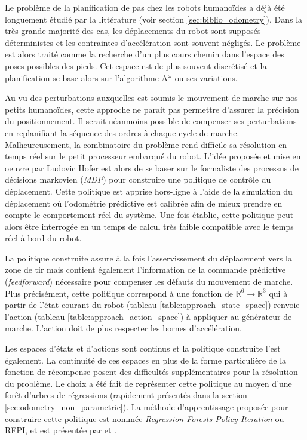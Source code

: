 Le problème de la planification de pas chez les robots humanoïdes 
a déjà été longuement étudié par la littérature (voir section \ref{sec:biblio_odometry}).
Dans la très grande majorité des cas, les déplacements du robot sont supposés
déterministes et les contraintes d'accélération sont souvent négligés. 
Le problème est alors traité comme la recherche d'un plus
cours chemin dans l'espace des poses possibles des pieds.
Cet espace est de plus souvent discrétisé et la planification se base
alors sur l'algorithme A* ou ses variations.

Au vu des perturbations auxquelles est soumis le mouvement de 
marche sur nos petits humanoïdes, cette approche ne parait pas 
permettre d'assurer la précision du positionnement.
Il serait néanmoins possible de compenser ses perturbations en replanifiant
la séquence des ordres à chaque cycle de marche.
Malheureusement, la combinatoire du problème rend difficile
sa résolution en temps réel sur le petit processeur embarqué du robot.
L'idée proposée et mise en oeuvre par Ludovic Hofer est alors 
de se baser sur le formaliste des processus de décisions markovien (\textit{MDP})
pour construire une politique de contrôle du déplacement.
Cette politique est apprise hors-ligne à l'aide de la simulation
du déplacement où l'odométrie prédictive est calibrée
afin de mieux prendre en compte le comportement réel du système.
Une fois établie, cette politique peut alors être interrogée
en un temps de calcul très faible compatible avec le temps réel 
à bord du robot.

La politique construite assure à la fois l'asservissement du déplacement
vers la zone de tir mais contient également l'information de la
commande prédictive (\textit{feedforward}) nécessaire pour compenser
les défauts du mouvement de marche.
Plus précisément, cette politique correspond à une fonction
de $\mathbb{R}^{6} \longrightarrow \mathbb{R}^{3}$ qui à partir
de l'état courant du robot (tableau \ref{table:approach_state_space}) 
renvoie l'action (tableau \ref{table:approach_action_space}) à appliquer 
au générateur de marche.
L'action doit de plus respecter les bornes d'accélération.

Les espaces d'états et d'actions sont continus et 
la politique construite l'est également.
La continuité de ces espaces en plus de la forme particulière de la 
fonction de récompense posent des difficultés supplémentaires 
pour la résolution du problème.
Le choix a été fait de représenter cette politique au moyen 
d'une forêt d'arbres de régressions (rapidement présentés dans la section \ref{sec:odometry_non_parametric}).
La méthode d'apprentissage proposée pour construire cette politique
est nommée \textit{Regression Forests Policy Iteration} ou RFPI,
et est présentée par \cite{hofer_online_2016} et \cite{ApproachICAPS2017}.

